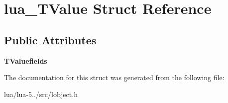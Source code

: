 \hypertarget{structlua___t_value}{\section{lua\+\_\+\+T\+Value Struct Reference}
\label{structlua___t_value}
}
\subsection*{Public Attributes}
\begin{DoxyCompactItemize}
\item 
\hypertarget{structlua___t_value_a9d2b6f4b9aa1afd4f1b04977b70b2caa}{{\bfseries T\+Valuefields}}\label{structlua___t_value_a9d2b6f4b9aa1afd4f1b04977b70b2caa}

\end{DoxyCompactItemize}


The documentation for this struct was generated from the following file\+:\begin{DoxyCompactItemize}
\item 
lua/lua-\/5../src/lobject.\+h\end{DoxyCompactItemize}
